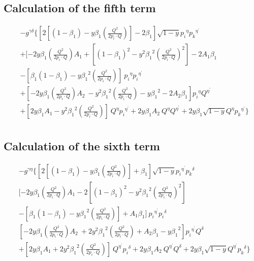 \subsection*{Calculation of the fifth term}

\begin{equation}
\begin{split} 
&-g^{{{\gamma}}{{\delta}}}\lbrace[2[(1-\beta_1)-y\beta_1 (\frac{Q^2}{2p_i \cdot Q})]-2\beta_1] \sqrt{1-y}{p_i}^{{\eta}}{{p_k}^{{\eta}^{\prime}}}\\
&+[-2y {\beta_1} (\frac{Q^2}{2p_i \cdot Q}) A_1+[(1-\beta_1)^2-y^2 {\beta_1}^2 (\frac{Q^2}{2p_i \cdot Q})^2]-2A_1\beta_1\\
&-[\beta_1(1-\beta_1)-y {\beta_1}^2 (\frac{Q^2}{2p_i \cdot Q})] \:{p_i}^{{\eta}}{p_i}^{{\eta}^{\prime}}\\
&+[-2y {\beta_1} (\frac{Q^2}{2p_i \cdot Q}) A_2\: -y^2 {\beta_1}^2 (\frac{Q^2}{2p_i \cdot Q})-y {\beta_1}^2 -2A_2\beta_1 ]{p_i}^{{\eta}}{Q}^{{\eta}^{\prime}}\\
&+[2y {\beta_1} A_1-y^2 {\beta_1}^2 (\frac{Q^2}{2p_i \cdot Q})] \:{Q}^{{\eta}}{p_i}^{{\eta}^{\prime}}+2y {\beta_1} A_2 \:{Q}^{{\eta}}{Q}^{{\eta}^{\prime}}+2y {\beta_1}\sqrt{1-y}{Q}^{{\eta}}{{p_k}^{{\eta}^{\prime}}}\rbrace\\
\end{split}
\end{equation}

\subsection*{Calculation of the sixth term}
\begin{equation}
\begin{split}
&-g^{{{\gamma}}{{\eta}}}\lbrace[2[(1-\beta_1)-y\beta_1 (\frac{Q^2}{2p_i \cdot Q})]+\beta_1 ] \sqrt{1-y}{p_i}^{{\eta}^{\prime}}{{p_k}^{{\delta}}}\\
&[-2y {\beta_1} (\frac{Q^2}{2p_i \cdot Q}) A_1-2[(1-\beta_1)^2-y^2 {\beta_1}^2 (\frac{Q^2}{2p_i \cdot Q})^2]\\
&-[\beta_1(1-\beta_1)-y {\beta_1}^2 (\frac{Q^2}{2p_i \cdot Q})] +A_1\beta_1 ] \:{p_i}^{{\eta}^{\prime}}{p_i}^{{\delta}}\\
&[-2y {\beta_1} (\frac{Q^2}{2p_i \cdot Q}) A_2\:+2y^2 {\beta_1}^2 (\frac{Q^2}{2p_i \cdot Q})+A_2\beta_1 -y {\beta_1}^2 ] {p_i}^{{\eta}^{\prime}}{Q}^{{\delta}}\\
&+[2y {\beta_1} A_1+2y^2 {\beta_1}^2 (\frac{Q^2}{2p_i \cdot Q})] \:{Q}^{{\eta}^{\prime}}{p_i}^{{\delta}}+2y {\beta_1} A_2 \:{Q}^{{\eta}^{\prime}}{Q}^{{\delta}}+2y {\beta_1}\sqrt{1-y}{Q}^{{\eta}^{\prime}}{{p_k}^{{\delta}}}
\rbrace
\end{split}
\end{equation}

